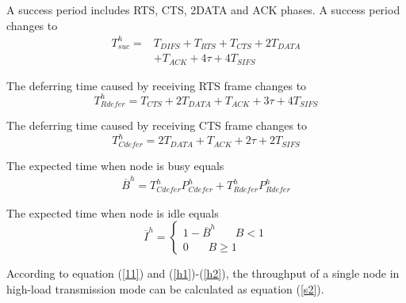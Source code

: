 \documentclass[conference]{IEEEtran}
\begin{document}
A success period includes RTS, CTS, 2DATA and ACK phases. A success period changes to
\begin{equation}
\begin{aligned}
T_{suc}^h=&T_{DIFS}+T_{RTS}+T_{CTS}+2T_{DATA}\\&
+T_{ACK}+4\tau+4T_{SIFS}
\end{aligned}
\end{equation}

The deferring time caused by receiving RTS frame changes to
\begin{equation*}
T_{Rdefer}^h=T_{CTS}+2T_{DATA}+T_{ACK}+3\tau+4T_{SIFS}
\end{equation*}

The deferring time caused by receiving CTS frame changes to
\begin{equation}
T_{Cdefer}^h=2T_{DATA}+T_{ACK}+2\tau+2T_{SIFS}
\end{equation}

The expected time when node is busy equals
\begin{equation}
\begin{aligned}
\overline B^h=T_{Cdefer}^hP_{Cdefer}^h+T_{Rdefer}^hP_{Rdefer}^h
\end{aligned}
\end{equation}

The expected time when node is idle equals
\begin{equation}
\overline I^h=\left\{
\begin{aligned}
1-\overline B^h \ \ \ \ \ \ \ \ B<1\\
0\ \ \ \ \ \ \ \    B\ge 1
\end{aligned}
\right.
\label{h2}
\end{equation}

According to equation (\ref{11}) and (\ref{h1})-(\ref{h2}), the throughput of a single node in high-load transmission mode can be calculated as equation (\ref{s2}).

\end{document}
